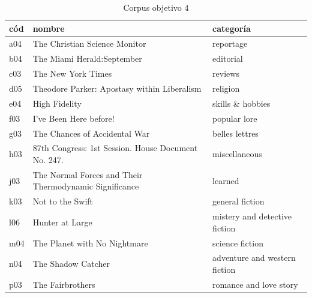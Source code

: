 \documentclass[12pt,letterpaper,twoside]{article}
\begin{document}
   \begin{table}[!ht]
      \centering
 \begin{tabular}{|l|l|l|}
 \hline
cód & nombre & categoría \\ \hline
        a04 & The Christian Science Monitor & reportage \\ \hline
        b04 & The Miami Herald:September & editorial \\ \hline
        c03 & The New York Times & reviews \\ \hline
        d05 & Theodore Parker: Apostasy within Liberalism & religion \\ \hline
        e04 & High Fidelity & skills \& hobbies \\ \hline
        f03 & I've Been Here before! & popular lore \\ \hline
        g03 & The Chances of Accidental War & belles lettres \\ \hline
        h03 & 87th Congress: 1st Session. House Document No. 247. & miscellaneous \\ \hline
        j03 & The Normal Forces and Their Thermodynamic Significance & learned \\ \hline
        k03 & Not to the Swift & general fiction \\ \hline
        l06 & Hunter at Large & mistery and detective fiction \\ \hline
        m04 & The Planet with No Nightmare & science fiction \\ \hline
        n04 & The Shadow Catcher & adventure and western fiction \\ \hline
        p03 & The Fairbrothers & romance and love story \\ \hline
     
      

      \end{tabular}
  \caption{Corpus objetivo 4}
  \label{tab:corpus_objetivo4}
  \end{table}
\end{document}

